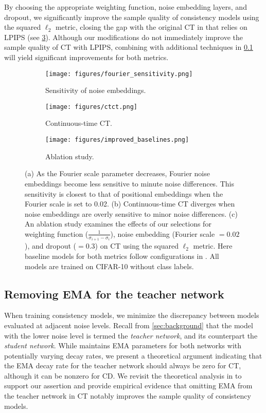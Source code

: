 By choosing the appropriate weighting function, noise embedding layers, and dropout, we significantly improve the sample quality of consistency models using the squared $\ell_2$ metric, closing the gap with the original CT in \citet{song2023consistency} that relies on LPIPS (see \cref{fig:improved_baselines}). Although our modifications do not immediately improve the sample quality of CT with LPIPS, combining with additional techniques in \cref{sec:noema} will yield significant improvements for both metrics.
\begin{figure}
    \centering
    \begin{subfigure}[b]{0.336\textwidth}
        \centering
        \texttt{[image: figures/fourier\_sensitivity.png]}
        \caption{Sensitivity of noise embeddings.}\label{fig:fourier_sensitivity}
    \end{subfigure}%
    \begin{subfigure}[b]{0.32\textwidth}
        \centering
        \texttt{[image: figures/ctct.png]}
        \caption{Continuous-time CT.}\label{fig:ctct}
    \end{subfigure}
    \begin{subfigure}[b]{0.32\textwidth}
        \centering
        \texttt{[image: figures/improved\_baselines.png]}
        \caption{Ablation study.}\label{fig:improved_baselines}
    \end{subfigure}
    \caption{(a) As the Fourier scale parameter decreases, Fourier noise embeddings become less sensitive to minute noise differences. This sensitivity is closest to that of positional embeddings when the Fourier scale is set to 0.02. (b) Continuous-time CT diverges when noise embeddings are overly sensitive to minor noise differences. (c) An ablation study examines the effects of our selections for weighting function ($\frac{1}{\sigma_{i+1} - \sigma_i}$), noise embedding (Fourier scale $= 0.02$), and dropout ($=0.3$) on CT using the squared $\ell_2$ metric. Here baseline models for both metrics follow configurations in \citet{song2023consistency}. All models are trained on CIFAR-10 without class labels.}\label{fig:improved}
\end{figure}
\subsection{Removing EMA for the teacher network}\label{sec:noema}

When training consistency models, we minimize the discrepancy between models evaluated at adjacent noise levels. Recall from \cref{sec:background} that the model with the lower noise level is termed the \emph{teacher network}, and its counterpart the \emph{student network}. While \citet{song2023consistency} maintains EMA parameters for both networks with potentially varying decay rates, we present a theoretical argument indicating that the EMA decay rate for the teacher network should always be zero for CT, although it can be nonzero for CD. We revisit the theoretical analysis in \citet{song2023consistency} to support our assertion and provide empirical evidence that omitting EMA from the teacher network in CT notably improves the sample quality of consistency models.



